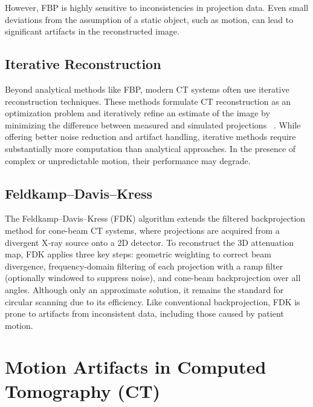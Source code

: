 However, FBP is highly sensitive to inconsistencies in projection data. Even small deviations from the assumption of a static object, such as motion, can lead to significant artifacts in the reconstructed image.

\subsection{Iterative Reconstruction}
Beyond analytical methods like FBP, modern CT systems often use iterative reconstruction techniques. These methods formulate CT reconstruction as an optimization problem and iteratively refine an estimate of the image by minimizing the difference between measured and simulated projections ~\cite{Buzug}. While offering better noise reduction and artifact handling, iterative methods require substantially more computation than analytical approaches. In the presence of complex or unpredictable motion, their performance may degrade.

\subsection{Feldkamp–Davis–Kress}
The Feldkamp–Davis–Kress (FDK) \cite{feldkamp1984practical} algorithm extends the filtered backprojection method for cone-beam CT systems, where projections are acquired from a divergent X‑ray source onto a 2D detector. To reconstruct the 3D attenuation map, FDK applies three key steps: geometric weighting to correct beam divergence, frequency-domain filtering of each projection with a ramp filter (optionally windowed to suppress noise), and cone-beam backprojection over all angles. Although only an approximate solution, it remains the standard for circular scanning due to its efficiency. Like conventional backprojection, FDK is prone to artifacts from inconsistent data, including those caused by patient motion. 



 

\section{Motion Artifacts in Computed Tomography (CT)}

